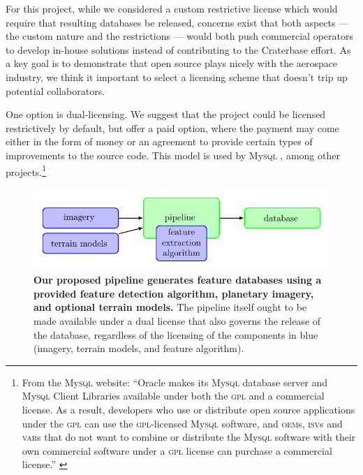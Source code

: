 \documentclass[12pt]{olfmemo}
\begin{document}
For this project, while we considered a custom restrictive license which would require that resulting databases be released, concerns exist that both aspects --- the custom nature and the restrictions --- would both push commercial operators to develop in-house solutions instead of contributing to the Craterbase effort. As a key goal is to demonstrate that open source plays nicely with the aerospace industry, we think it important to select a licensing scheme that doesn't trip up potential collaborators.

One option is dual-licensing. We suggest that the project could be licensed restrictively by default, but offer a paid option, where the payment may come either in the form of money or an agreement to provide certain types of improvements to the source code. This model is used by My\textsc{sql} \citep{MySQL}, among other projects.\footnote{From the My\textsc{sql} website: ``Oracle makes its My\textsc{sql} database server and My\textsc{sql} Client Libraries available under both the \textsc{gpl} and a commercial license. As a result, developers who use or distribute open source applications under the \textsc{gpl} can use the \textsc{gpl}-licensed My\textsc{sql} software, and \textsc{oem}s, \textsc{isv}s and \textsc{var}s that do not want to combine or distribute the My\textsc{sql} software with their own commercial software under a \textsc{gpl} license can purchase a commercial license.'' \citep{MySQL}}


\begin{figure}
\center\includegraphics{flowchart.pdf}
\caption{\label{fig:flowchart}\textbf{Our proposed pipeline generates feature databases using a provided feature detection algorithm, planetary imagery, and optional terrain models.} The pipeline itself ought to be made available under a dual license that also governs the release of the database, regardless of the licensing of the components in blue (imagery, terrain models, and feature algorithm).}
\end{figure}
\end{document}
